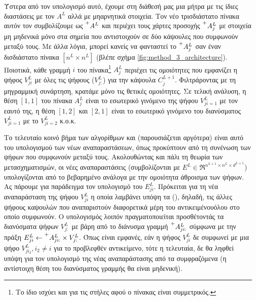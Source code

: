 Ύστερα από τον υπολογισμό αυτό, έχουμε στη διάθεσή μας μια μήτρα με τις ίδιες διαστάσεις με τον $A^L$ αλλά με μη\textendash αρνητικά στοιχεία. Τον νέο τρισδιάστατο πίνακα αυτόν τον συμβολίζουμε ως $\prescript{+}{}{A^{L}}$ και περιέχει τους χάρτες προσοχής $\prescript{+}{}{A_j^{L}}$ με στοιχεία μη μηδενικά μόνο στα σημεία που αντιστοιχούν σε δύο κάψουλες που συμφωνούν μεταξύ τους. Με άλλα λόγια, μπορεί κανείς να φανταστεί το $\prescript{+}{}{A_j^{L}}$ σαν έναν δισδιάστατο πίνακα $[n^L \times n^L]$ (βλέπε σχήμα \ref{fig:method_3_architecture}). Ποιοτικά, κάθε γραμμή $i$ του πίνακα\footnote{Το ίδιο ισχύει και για τις στήλες αφού ο πίνακας είναι συμμετρικός.} $A_j^{L}$ περιέχει τις ομοιότητες που εμφανίζει η ψήφος $V_{ji}^L$ με όλες τις ψήφους ($V_{j:}^L$) για την κάψουλα $C_j^{L+1}$. Φιλτράροντας με τη μη\textendash γραμμική συνάρτηση, κρατάμε μόνο τις θετικές ομοιότητες. Σε τελική ανάλυση, η θέση $[1,1]$ του πίνακα $A_j^{L}$ είναι το εσωτερικό γινόμενο της ψήφου $V_{ji=1}^L$ με τον εαυτό της, η θέση $[1,2]$ και $[2,1]$ είναι το εσωτερικό γινόμενο του διανύσματος $V_{ji=1}^L$ με το $V_{ji=2}^L$ κ.ο.κ.\par

Το τελευταίο κοινό βήμα των αλγορίθμων  και  (παρουσιάζεται αργότερα) είναι αυτό του υπολογισμού των νέων αναπαραστάσεων, όπως προκύπτουν από τη συνένωση των ψήφων που συμφωνούν μεταξύ τους. Ακολουθώντας και πάλι τη θεωρία των μετασχηματισμών, οι νέες αναπαραστάσεις (συμβολίζονται με $E^L \in \Re^{n^{L+1} \times n^{L} \times d^{L+1}}$) υπολογίζονται από το βεβαρημένο ανάλογα με την ομοιότητα άθροισμα των ψήφων. Ας πάρουμε για παράδειγμα τον υπολογισμό του $E^L_{ji}$. Πρόκειται για τη νέα αναπαράσταση της ψήφου $V^L_{ji}$ η οποία λαμβάνει υπόψη τα  (), δηλαδή, τις άλλες ψήφους καψουλών που αναπαριστούν διαφορετικά μέρη του αντικειμένου\textendash όλου στο οποίο συμφωνούν. Ο υπολογισμός λοιπόν πραγματοποιείται προσθέτοντάς τα διανύσματα ψήφων $V^L_{j:}$ με βάρη από το διάνυσμα γραμμή $\prescript{+}{}{A_{ji:}^{L}}$ σύμφωνα με την πράξη $E^L_{ji} \gets \prescript{+}{}{A_{ji:}^{L}} \times V^L_{j:}$. Όπως είναι εμφανές, εάν η ψήφος $V^L_{ji}$ δε συμφωνεί με μια ψήφο $V^L_{ji_2}, i_2 \neq i$ για το προβλεφθέν αντικείμενο, τότε η τελευταία, δε θα ληφθεί υπόψη για τον υπολογισμό της νέας αναπαράστασης από τα συμφραζόμενα (η αντίστοιχη θέση του διανύσματος γραμμής θα είναι μηδενική).\par


